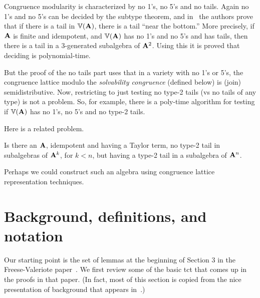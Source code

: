 Congruence modularity is characterized by no 1's, no 5's and no tails.
Again no 1's and no 5's can be decided by the subtype theorem,
and in~\cite{Freese:2009} the authors prove that if there is
a tail in $\operatorname{\mathbb{V}}(\mathbf{A})$, there is a tail ``near the bottom.''
More precisely, if $\mathbf{A}$ is finite and idempotent, and $\operatorname{\mathbb{V}}(\mathbf{A})$ has no
1's and no 5's and has tails, then there is a tail in a 3-generated subalgebra of $\mathbf{A}^2$.
Using this it is proved that deciding \cm is polynomial-time.

But the proof of the no tails part uses that in a variety with no 1's or 5's,
the congruence lattice modulo the {\it solvability congruence} (defined below)
is (join) semidistributive.
Now, restricting to just testing no type-2 tails (vs no tails of any type) is
not a problem. So, for example, there is a poly-time algorithm for testing if
$\operatorname{\mathbb{V}}(\mathbf{A})$ has no 1's, no 5's and no type-2 tails.  

Here is a related problem.
\begin{prob}
  \label{prob:3}
  Is there an $\mathbf{A}$, idempotent and having a Taylor term, no type-2 tail in 
  subalgebras of $\mathbf{A}^k$, for $k < n$, but having a type-2 tail in a subalgebra
  of $\mathbf{A}^n$. 
\end{prob}
Perhaps we could construct such an algebra using congruence lattice
representation techniques. 



\section{Background, definitions, and notation}
\label{sec:defin-notat}
Our starting point is the set of lemmas at the beginning of Section 3 in
the Freese-Valeriote paper~\cite{Freese:2009}.
We first review some of the basic \ac{tct}
that comes up in the proofs in that paper. (In fact, most of this section 
is copied from the nice presentation of \tct background that appears
in~\cite[Sec.~2]{Freese:2009}.)

